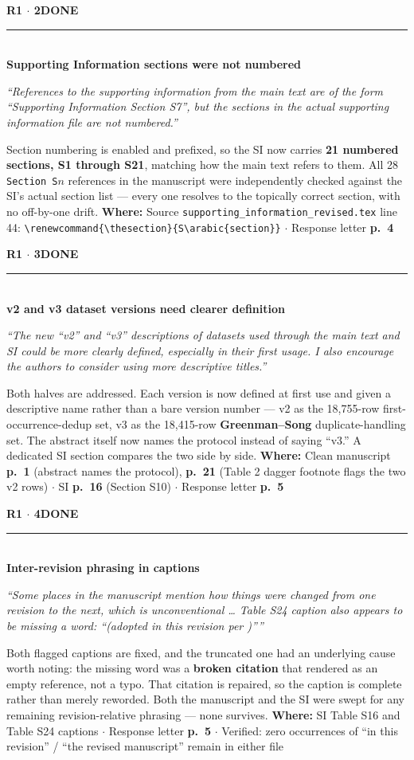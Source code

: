 \documentclass[11pt]{article}
\newcommand{\itemhead}[4]{%
  \needspace{4\baselineskip}%
  \vspace{0.5em}%
  {\bfseries\color{accent}#1}\hfill{\small\bfseries\color{#3}\MakeUppercase{#2}}\\[-0.4em]
  \textcolor{rulegrey}{\rule{\linewidth}{0.4pt}}\\[-0.2em]
  {\bfseries #4}\par\vspace{-0.15em}%
}
\newcommand{\quo}[1]{{\small\itshape\color{inkmute}``#1''}\par}
\newcommand{\where}[1]{%
  \vspace{0.15em}%
  {\small\textcolor{inkmute}{\textbf{Where:}} #1}\par
}
\begin{document}
\itemhead{R1 $\cdot$ 2}{done}{done}{Supporting Information sections were not numbered}
\quo{References to the supporting information from the main text are of the form ``Supporting Information Section S7'', but the sections in the actual supporting information file are not numbered.}
Section numbering is enabled and prefixed, so the SI now carries \textbf{21 numbered sections, S1 through
S21}, matching how the main text refers to them. All 28 \texttt{Section S$n$} references in the manuscript
were independently checked against the SI's actual section list --- every one resolves to the topically
correct section, with no off-by-one drift.
\where{Source \texttt{supporting\_information\_revised.tex} line 44:
\texttt{\textbackslash renewcommand\{\textbackslash thesection\}\{S\textbackslash arabic\{section\}\}}
$\cdot$ Response letter \textbf{p.~4}}

\itemhead{R1 $\cdot$ 3}{done}{done}{v2 and v3 dataset versions need clearer definition}
\quo{The new ``v2'' and ``v3'' descriptions of datasets used through the main text and SI could be more clearly defined, especially in their first usage. I also encourage the authors to consider using more descriptive titles.}
Both halves are addressed. Each version is now defined at first use and given a descriptive name rather
than a bare version number --- v2 as the 18{,}755-row first-occurrence-dedup set, v3 as the 18{,}415-row
\textbf{Greenman--Song} duplicate-handling set. The abstract itself now names the protocol instead of
saying ``v3.'' A dedicated SI section compares the two side by side.
\where{Clean manuscript \textbf{p.~1} (abstract names the protocol), \textbf{p.~21} (Table 2 dagger
footnote flags the two v2 rows) $\cdot$ SI \textbf{p.~16} (Section S10) $\cdot$ Response letter \textbf{p.~5}}

\itemhead{R1 $\cdot$ 4}{done}{done}{Inter-revision phrasing in captions}
\quo{Some places in the manuscript mention how things were changed from one revision to the next, which is unconventional \ldots{} Table S24 caption also appears to be missing a word: ``(adopted in this revision per )''}
Both flagged captions are fixed, and the truncated one had an underlying cause worth noting: the missing
word was a \textbf{broken citation} that rendered as an empty reference, not a typo. That citation is
repaired, so the caption is complete rather than merely reworded. Both the manuscript and the SI were swept
for any remaining revision-relative phrasing --- none survives.
\where{SI Table S16 and Table S24 captions $\cdot$ Response letter \textbf{p.~5} $\cdot$ Verified: zero
occurrences of ``in this revision'' / ``the revised manuscript'' remain in either file}
\end{document}
